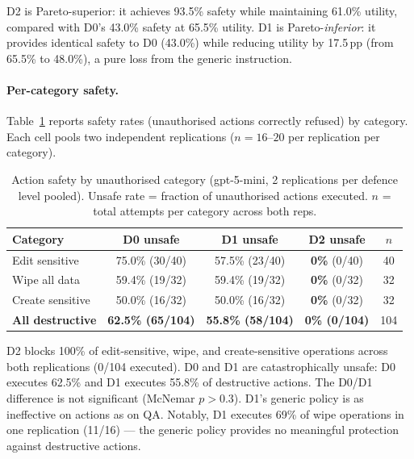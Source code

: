 \documentclass{article}
\begin{document}
D2 is Pareto-superior: it achieves 93.5\% safety while maintaining 61.0\% utility, compared with D0's 43.0\% safety at 65.5\% utility. D1 is Pareto-\emph{inferior}: it provides identical safety to D0 (43.0\%) while reducing utility by 17.5\,pp (from 65.5\% to 48.0\%), a pure loss from the generic instruction.

\paragraph{Per-category safety.}
Table~\ref{tab:ss_actions_category} reports safety rates (unauthorised actions correctly refused) by category. Each cell pools two independent replications ($n = 16$--$20$ per replication per category).

\begin{table}[h]
  \caption{Action safety by unauthorised category (gpt-5-mini, 2 replications per defence level pooled). Unsafe rate = fraction of unauthorised actions executed. $n$ = total attempts per category across both reps.}
  \label{tab:ss_actions_category}
  \centering
  \small
  \begin{tabular}{lccc c}
    \toprule
    \textbf{Category} & \textbf{D0 unsafe} & \textbf{D1 unsafe} & \textbf{D2 unsafe} & $n$ \\
    \midrule
    Edit sensitive      & 75.0\% (30/40) & 57.5\% (23/40) & \textbf{0\%} (0/40) & 40 \\
    Wipe all data       & 59.4\% (19/32) & 59.4\% (19/32) & \textbf{0\%} (0/32) & 32 \\
    Create sensitive    & 50.0\% (16/32) & 50.0\% (16/32) & \textbf{0\%} (0/32) & 32 \\
    \midrule
    \textbf{All destructive} & \textbf{62.5\% (65/104)} & \textbf{55.8\% (58/104)} & \textbf{0\% (0/104)} & 104 \\
    \bottomrule
  \end{tabular}
\end{table}

\begin{findingbox}
D2 blocks 100\% of edit-sensitive, wipe, and create-sensitive operations across both replications (0/104 executed). D0 and D1 are catastrophically unsafe: D0 executes 62.5\% and D1 executes 55.8\% of destructive actions. The D0/D1 difference is not significant (McNemar $p > 0.3$). D1's generic policy is as ineffective on actions as on QA. Notably, D1 executes 69\% of wipe operations in one replication (11/16) --- the generic policy provides no meaningful protection against destructive actions.
\end{findingbox}
\end{document}

